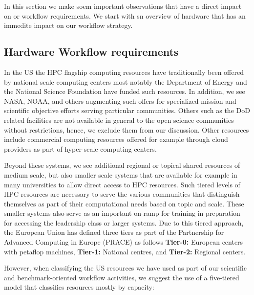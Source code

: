 \documentclass[utf8]{FrontiersinVancouver} %
\begin{document}
In this section we make soem important observations that have a direct impact on or workflow requirements. We start with sn overview of hardware that has an immedite impact on our workflow strategy.

\subsection{Hardware Workflow requirements}\label{sec:hw-requirements}

In the US the HPC flagship computing resources have traditionally been offered by national scale computing centers most notably the Department of Energy and the National Science Foundation have funded such resources. In addition, we see NASA, NOAA, and others augmenting such offers for specialized mission and scientific objective efforts serving particular communities. Others such as the DoD related facilities are not available in general to the open science communities without restrictions, hence, we exclude them from our discussion. Other resources include commercial computing resources offered for example through cloud
providers as part of hyper-scale computing centers.

Beyond these systems, we see additional regional or topical shared resources of medium scale, but also smaller scale systems that are available for example in many universities to allow direct access to HPC resources. Such tiered levels of HPC resources are necessary to serve the various communities that distinguish themselves as part of their computational needs based on topic and scale. These smaller systems also serve as an important on-ramp for training in preparation for accessing the leadership class or larger systems.  Due to this tiered approach, the European Union has defined three tiers as part of the Partnership for Advanced Computing in Europe (PRACE) \cite{www-prace,prace-fact} as follows {\bf Tier-0:} European centers with petaflop machines, {\bf Tier-1:} National centres, and {\bf Tier-2:} Regional centers.
  
However, when classifying the US resources we have used as part of our scientific and benchmark-oriented workflow activities, we suggest the use of  a five-tiered model that classifies resources mostly by capacity:
\end{document}

